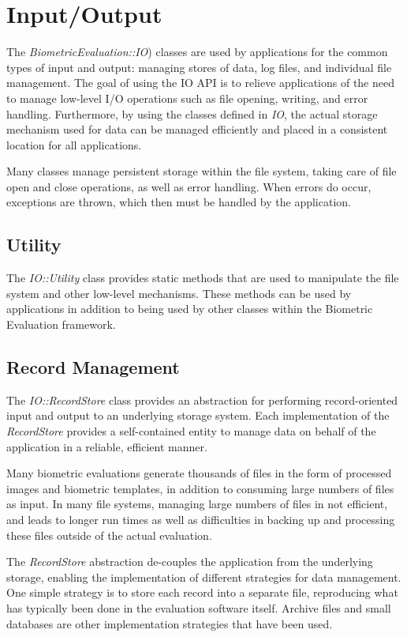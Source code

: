 %
%
\chapter{Input/Output}
\label{chp-io}

The {\em BiometricEvaluation::IO}) classes are used
by applications for the common types of input and output: managing stores of
data, log files, and individual file management. The goal of using the IO API 
is to relieve applications of the need to manage low-level I/O operations such
as file opening, writing, and error handling. Furthermore, by using the classes
defined in {\em IO}, the actual storage mechanism used for data can be managed 
efficiently and placed in a consistent location for all applications.

Many classes manage persistent storage within the file system,
taking care of file open and close operations, as well as error handling. When
errors do occur, exceptions are thrown, which then must be handled by the
application.

\section{Utility}

The {\em IO::Utility} class provides static methods that are used to
manipulate the file system and other low-level mechanisms. These methods
can be used by applications in addition to being used by other classes 
within the Biometric Evaluation framework.

\section{Record Management}

The {\em IO::RecordStore} class provides an abstraction for performing
record-oriented input and output to an underlying storage system. Each
implementation of the {\em RecordStore} provides a self-contained entity to
manage data on behalf of the application in a reliable, efficient manner.

Many biometric evaluations generate thousands of files in the form of processed
images and biometric templates, in addition to consuming large numbers of files
as input. In many file systems, managing large numbers of files in not
efficient, and leads to longer run times as well as difficulties in backing up
and processing these files outside of the actual evaluation.

The {\em RecordStore} abstraction de-couples the application from
the underlying storage, enabling the implementation of different strategies for
data management. One simple strategy is to store each record into a separate
file, reproducing what has typically been done in the evaluation software
itself. Archive files and small databases are other implementation strategies
that have been used.

